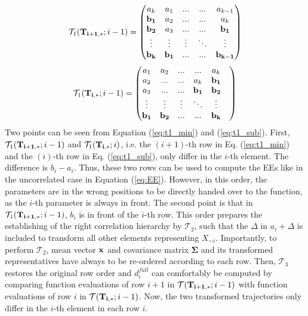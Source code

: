 \documentclass[a4paper,12pt]{article}
\begin{document}
\begin{align} \label{eq:t1_min}
\mathcal{T}_1(\bold{T_{i+1,*}}; i-1)
=
\begin{pmatrix}
a_k & a_1 & ... & ... &  a_{k-1} \\
\bold{b_1} & a_2 & ... & ... &  a_k \\
\bold{b_2} & a_3 & ... & ... &  \bold{b_1} \\
\vdots & \vdots & \vdots & 	\ddots &  \vdots\\
\bold{b_k} & \bold{b_{1}} & ... & ... &  \bold{b_{k-1}}
\end{pmatrix}
\end{align}
\begin{align} \label{eq:t1_sub}
\mathcal{T}_1(\bold{T_{i,*}}; i-1)=
\begin{pmatrix}
a_1 & a_2 & ... & ... &  a_k \\
a_2 & ... & ... &  a_k & \bold{b_1} \\
a_3 & ... & ... &  \bold{b_1} & \bold{b_2} & \\
\vdots & \vdots & \vdots & 	\ddots &  \vdots\\
\bold{b_1} & \bold{b_{2}} & ... & ... &  \bold{b_{k}}
\end{pmatrix}
\end{align}
Two points can be seen from Equation (\ref{eq:t1_min}) and (\ref{eq:t1_sub}). First, $\mathcal{T}_1(\bold{T_{i+1,*}}; i-1)$ and $\mathcal{T}_1(\bold{T_{i,*}}; i)$, i.e. the $(i+1)$-th row in Eq. (\ref{eq:t1_min}) and the $(i)$-th row in Eq. (\ref{eq:t1_sub}), only differ in the $i$-th element. The difference is $b_i - a_i$. Thus, these two rows can be used to compute the EEs like in the uncorrelated case in Equation (\ref{eq:EE}). However, in this order, the parameters are in the wrong positions to be directly handed over to the function, as the $i$-th parameter is always in front. The second point is that in $\mathcal{T}_1(\bold{T_{i+1,*}}; i-1)$, $b_i$ is in front of the $i$-th row. This order prepares the establishing of the right correlation hierarchy by $\mathcal{T}_2$, such that the $\Delta$ in $a_i + \Delta$ is included to transform all other elements representing $X_{\sim i}$. Importantly, to perform $\mathcal{T}_2$, mean vector $\bold{x}$ and covariance matrix $\pmb{\Sigma}$ and its transformed representatives have always to be re-ordered according to each row. 
Then, $\mathcal{T}_3$ restores the original row order and $d_i^{full}$ can comfortably be computed by comparing function evaluations of row $i+1$ in $\mathcal{T}(\bold{T_{i+1,*}}; i-1)$ with function evaluations of row $i$ in $\mathcal{T}(\bold{T_{i,*}}; i-1)$. Now, the two transformed trajectories only differ in the $i$-th element in each row $i$. \\
\end{document}
